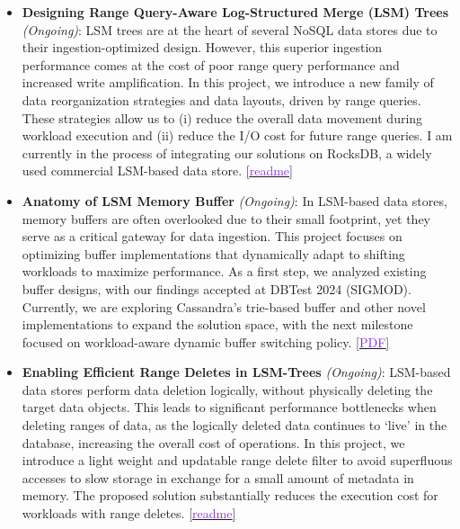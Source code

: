 \begin{itemize}[topsep=0pt, itemsep=0pt, parsep=0.5pt]
  \item \textbf{Designing Range Query-Aware Log-Structured Merge (LSM) Trees} \textit{(Ongoing)}: LSM trees are at 
  the heart of several NoSQL data stores due to their ingestion-optimized design. However, this superior ingestion 
  performance comes at the cost of poor range query performance and increased write amplification. In this project, we 
  introduce a new family of data reorganization strategies and data layouts, driven by range queries. These strategies allow us to (i) 
  reduce the overall data movement during workload execution and (ii) reduce the I/O cost for future range queries. I am
  currently in the process of integrating our solutions on RocksDB, a widely used commercial LSM-based data store.
  \href{https://shubhamkaushik.com/projects/designing_range_query_aware_log_structured_merge_tree/}{[\textcolor{blueviolet}{readme}]}

  \item \textbf{Anatomy of LSM Memory Buffer} \textit{(Ongoing)}: In LSM-based data stores, memory buffers are often overlooked 
  due to their small footprint, yet they serve as a critical gateway for data ingestion. This project focuses on optimizing 
  buffer implementations that dynamically adapt to shifting workloads to maximize performance. As a first step, we analyzed 
  existing buffer designs, with our findings accepted at DBTest 2024 (SIGMOD). Currently, we are exploring Cassandra’s trie-based 
  buffer and other novel implementations to expand the solution space, with the next milestone focused on workload-aware dynamic buffer switching policy.
  \href{https://shubhamkaushik.com/assets/pdf/LSMMemory.pdf}{[\textcolor{blueviolet}{PDF}]}

  \item \textbf{Enabling Efficient Range Deletes in LSM-Trees} \textit{(Ongoing)}: LSM-based data stores perform 
  data deletion logically, without physically deleting the target data objects. This leads to significant performance 
  bottlenecks when deleting ranges of data, as the logically deleted data continues to `live' in the database, 
  increasing the overall cost of operations. In this project, we introduce a light weight and updatable range delete filter to avoid 
  superfluous accesses to slow storage in exchange for a small amount of metadata in memory. The proposed solution 
  substantially reduces the execution cost for workloads with range deletes.
  \href{https://shubhamkaushik.com/projects/enabling_efficient_range_deletes_in_lsm_trees/}{[\textcolor{blueviolet}{readme}]}



\end{itemize}
